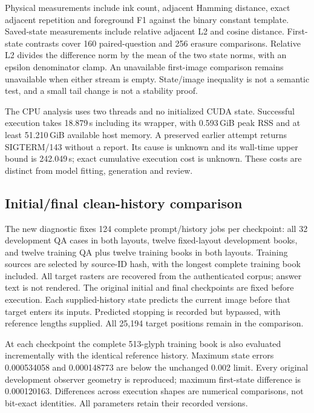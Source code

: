 \documentclass[12pt,a4paper]{article}
\providecommand{\DIFadd}[1]{{\protect\color{blue} \sf #1}} %
\begin{document}
\DIFadd{Physical measurements include ink count, adjacent Hamming distance, exact
adjacent repetition and foreground F1 against the binary constant template.
Saved-state measurements include relative adjacent L2 and cosine distance.
First-state contrasts cover 160 paired-question and 256 erasure comparisons.
Relative L2 divides the difference norm by the mean of the two state norms,
with an epsilon denominator clamp. An unavailable first-image comparison
remains unavailable when either stream is empty. State/image inequality is
not a semantic test, and a small tail change is not a stability proof.
}

\DIFadd{The CPU analysis uses two threads and no initialized CUDA state. Successful
execution takes 18.879\,s including its wrapper, with 0.593\,GiB peak RSS and
at least 51.210\,GiB available host memory. A preserved earlier attempt returns
SIGTERM/143 without a report. Its cause is unknown and its wall-time upper
bound is 242.049\,s; exact cumulative execution cost is unknown. These costs
are distinct from model fitting, generation and review.
}

\subsection*{\DIFadd{Initial/final clean-history comparison}}
\DIFadd{The new diagnostic fixes 124 complete prompt/history jobs per checkpoint:
all 32 development QA cases in both layouts, twelve fixed-layout development
books, and twelve training QA plus twelve training books in both layouts.
Training sources are selected by source-ID hash, with the longest complete
training book included. All target rasters are recovered from the authenticated
corpus; answer text is not rendered. The original initial and final checkpoints
are fixed before execution. Each supplied-history state predicts the current
image before that target enters its inputs. Predicted stopping is recorded but
bypassed, with reference lengths supplied. All 25,194 target positions remain
in the comparison.
}

\DIFadd{At each checkpoint the complete 513-glyph training book is also evaluated
incrementally with the identical reference history. Maximum state errors
0.000534058 and 0.000148773 are below the unchanged 0.002 limit. Every original
development observer geometry is reproduced; maximum first-state difference
is 0.000120163. Differences across execution shapes are numerical comparisons,
not bit-exact identities. All parameters retain their recorded versions.
}
\end{document}
